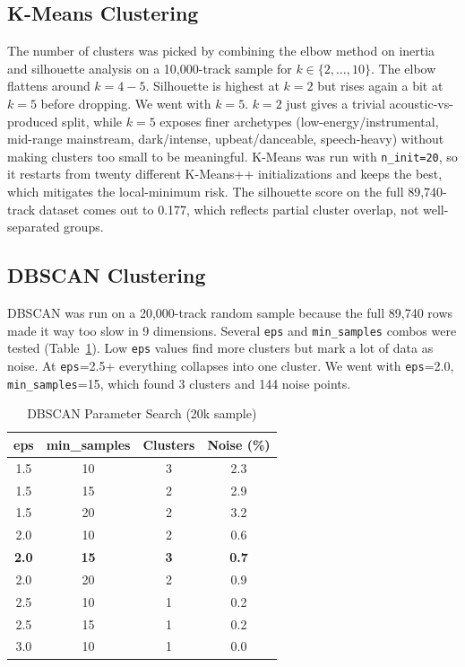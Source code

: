 \documentclass[10pt,twocolumn]{article}
\begin{document}
\subsection{K-Means Clustering}
The number of clusters was picked by combining the elbow method on inertia and silhouette analysis on a 10,000-track sample for $k \in \{2, \ldots, 10\}$. The elbow flattens around $k=4{-}5$. Silhouette is highest at $k=2$ but rises again a bit at $k=5$ before dropping. We went with $k=5$. $k=2$ just gives a trivial acoustic-vs-produced split, while $k=5$ exposes finer archetypes (low-energy/instrumental, mid-range mainstream, dark/intense, upbeat/danceable, speech-heavy) without making clusters too small to be meaningful. K-Means was run with \texttt{n\_init=20}, so it restarts from twenty different K-Means++ initializations and keeps the best, which mitigates the local-minimum risk. The silhouette score on the full 89,740-track dataset comes out to 0.177, which reflects partial cluster overlap, not well-separated groups.

\subsection{DBSCAN Clustering}

DBSCAN was run on a 20,000-track random sample because the full 89,740 rows made it way too slow in 9 dimensions. Several \texttt{eps} and \texttt{min\_samples} combos were tested (Table~\ref{tab:dbscan}). Low \texttt{eps} values find more clusters but mark a lot of data as noise. At \texttt{eps}=2.5+ everything collapses into one cluster. We went with \texttt{eps}=2.0, \texttt{min\_samples}=15, which found 3 clusters and 144 noise points.

\begin{table}[htbp]
\caption{DBSCAN Parameter Search (20k sample)}
\label{tab:dbscan}
\centering
\footnotesize
\begin{tabular}{@{}cccc@{}}
\toprule
\textbf{eps} & \textbf{min\_samples} & \textbf{Clusters} & \textbf{Noise (\%)} \\
\midrule
1.5 & 10 & 3 & 2.3 \\
1.5 & 15 & 2 & 2.9 \\
1.5 & 20 & 2 & 3.2 \\
2.0 & 10 & 2 & 0.6 \\
\textbf{2.0} & \textbf{15} & \textbf{3} & \textbf{0.7} \\
2.0 & 20 & 2 & 0.9 \\
2.5 & 10 & 1 & 0.2 \\
2.5 & 15 & 1 & 0.2 \\
3.0 & 10 & 1 & 0.0 \\
\bottomrule
\end{tabular}
\end{table}
\end{document}
